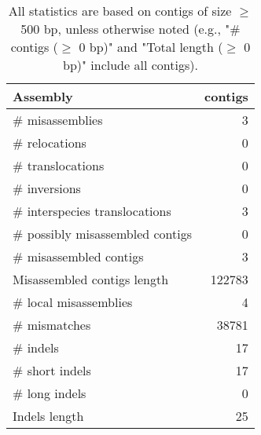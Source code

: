 \documentclass[12pt,a4paper]{article}
\begin{document}
\begin{table}[ht]
\begin{center}
\caption{All statistics are based on contigs of size $\geq$ 500 bp, unless otherwise noted (e.g., "\# contigs ($\geq$ 0 bp)" and "Total length ($\geq$ 0 bp)" include all contigs).}
\begin{tabular}{|l*{1}{|r}|}
\hline
Assembly & contigs \\ \hline
\# misassemblies & 3 \\ \hline
\hspace{5mm}\# relocations & 0 \\ \hline
\hspace{5mm}\# translocations & 0 \\ \hline
\hspace{5mm}\# inversions & 0 \\ \hline
\hspace{5mm}\# interspecies translocations & 3 \\ \hline
\# possibly misassembled contigs & 0 \\ \hline
\# misassembled contigs & 3 \\ \hline
Misassembled contigs length & 122783 \\ \hline
\# local misassemblies & 4 \\ \hline
\# mismatches & 38781 \\ \hline
\# indels & 17 \\ \hline
\hspace{5mm}\# short indels & 17 \\ \hline
\hspace{5mm}\# long indels & 0 \\ \hline
Indels length & 25 \\ \hline
\end{tabular}
\end{center}
\end{table}
\end{document}
